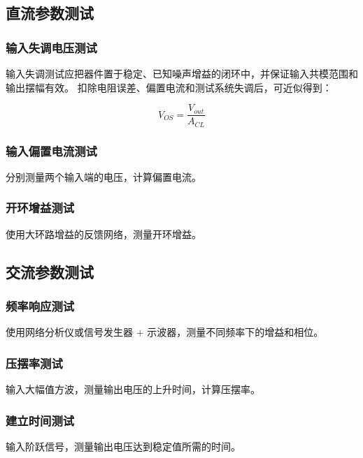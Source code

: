 \subsection{直流参数测试}

\subsubsection{输入失调电压测试}

输入失调测试应把器件置于稳定、已知噪声增益的闭环中，并保证输入共模范围和输出摆幅有效。
扣除电阻误差、偏置电流和测试系统失调后，可近似得到：

\begin{equation}
V_{OS} = \frac{V_{out}}{A_{CL}} \label{eq:test-vos}
\end{equation}

\subsubsection{输入偏置电流测试}

分别测量两个输入端的电压，计算偏置电流。

\subsubsection{开环增益测试}

使用大环路增益的反馈网络，测量开环增益。

\subsection{交流参数测试}

\subsubsection{频率响应测试}

使用网络分析仪或信号发生器 + 示波器，测量不同频率下的增益和相位。

\subsubsection{压摆率测试}

输入大幅值方波，测量输出电压的上升时间，计算压摆率。

\subsubsection{建立时间测试}

输入阶跃信号，测量输出电压达到稳定值所需的时间。

